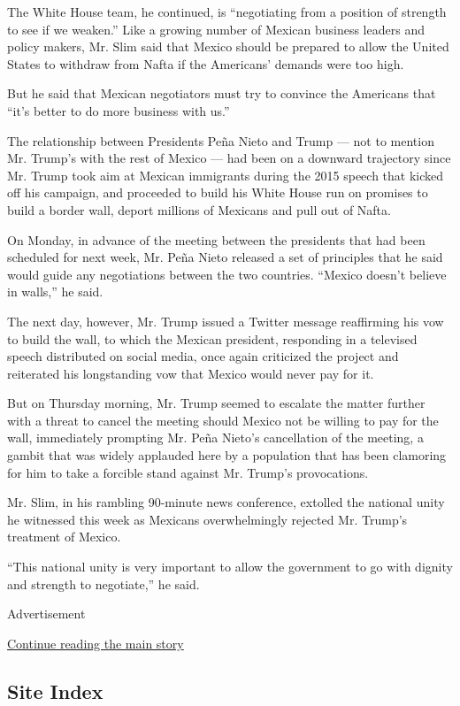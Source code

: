 The White House team, he continued, is ``negotiating from a position of
strength to see if we weaken.'' Like a growing number of Mexican
business leaders and policy makers, Mr. Slim said that Mexico should be
prepared to allow the United States to withdraw from Nafta if the
Americans' demands were too high.

But he said that Mexican negotiators must try to convince the Americans
that ``it's better to do more business with us.''

The relationship between Presidents Peña Nieto and Trump --- not to
mention Mr. Trump's with the rest of Mexico --- had been on a downward
trajectory since Mr. Trump took aim at Mexican immigrants during the
2015 speech that kicked off his campaign, and proceeded to build his
White House run on promises to build a border wall, deport millions of
Mexicans and pull out of Nafta.

On Monday, in advance of the meeting between the presidents that had
been scheduled for next week, Mr. Peña Nieto released a set of
principles that he said would guide any negotiations between the two
countries. ``Mexico doesn't believe in walls,'' he said.

The next day, however, Mr. Trump issued a Twitter message reaffirming
his vow to build the wall, to which the Mexican president, responding in
a televised speech distributed on social media, once again criticized
the project and reiterated his longstanding vow that Mexico would never
pay for it.

But on Thursday morning, Mr. Trump seemed to escalate the matter further
with a threat to cancel the meeting should Mexico not be willing to pay
for the wall, immediately prompting Mr. Peña Nieto's cancellation of the
meeting, a gambit that was widely applauded here by a population that
has been clamoring for him to take a forcible stand against Mr. Trump's
provocations.

Mr. Slim, in his rambling 90-minute news conference, extolled the
national unity he witnessed this week as Mexicans overwhelmingly
rejected Mr. Trump's treatment of Mexico.

``This national unity is very important to allow the government to go
with dignity and strength to negotiate,'' he said.

Advertisement

\protect\hyperlink{after-bottom}{Continue reading the main story}

\hypertarget{site-index}{%
\subsection{Site Index}\label{site-index}}

